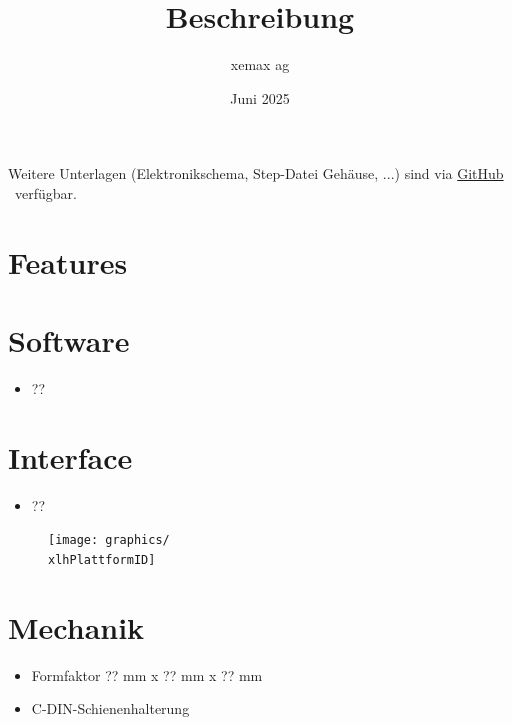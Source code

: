 \documentclass[10pt]{datasheet}
\title{Beschreibung \xlhPlattformID}
\author{xemax ag}
\date{Juni 2025}
\begin{document}
\maketitle





Weitere Unterlagen (Elektronikschema, Step-Datei Gehäuse, ...) sind via
\href{https://github.com/xemax-ag/xLH/}{GitHub \xlhPlattformID}\ verfügbar.

\section{Features}


\section{Software}

\begin{itemize}
    \item ??
\end{itemize}

\section{Interface}

\begin{itemize}
    \item ??
\end{itemize}

\vfill\break

\begin{figure}[h]
    \centering
    \texttt{[image: graphics/\\xlhPlattformID]}
\end{figure}

\section{Mechanik}

\begin{itemize}
    \item Formfaktor ?? mm x ?? mm x ?? mm
    \item C-DIN-Schienenhalterung
\end{itemize}
\end{document}
